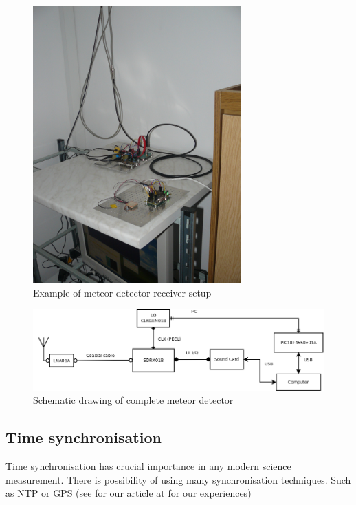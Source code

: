\documentclass[12pt,a4paper,oneside]{article}
\begin{document}
\begin{figure} [htbp]
\begin{center}
\includegraphics [width=80mm] {./img/meteor-detector_receiver.JPG} 
\end{center}
\caption{Example of meteor detector receiver setup}
\end{figure}


\begin{figure} [htbp]
\begin{center}
\includegraphics [width=150mm] {./img/RMDS01A_system.png} 
\end{center}
\caption{Schematic drawing of complete meteor detector}
\end{figure}


\subsection{Time synchronisation}

Time synchronisation has crucial importance in any modern science measurement. There is possibility of using many synchronisation techniques. Such as NTP or GPS (see for our article at  for our experiences)
\end{document}
